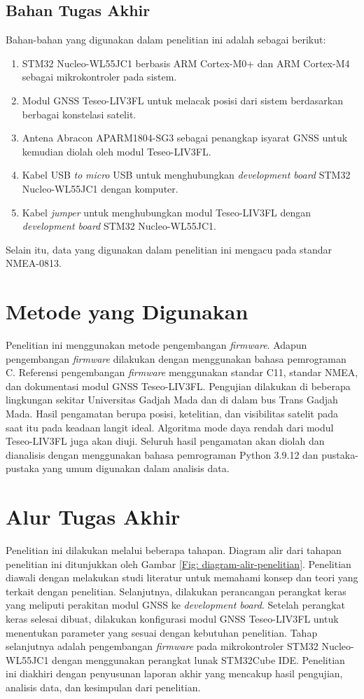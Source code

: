 \subsection{Bahan Tugas Akhir}
Bahan-bahan yang digunakan dalam penelitian ini adalah sebagai berikut:
\begin{enumerate}
	\item STM32 Nucleo-WL55JC1 berbasis ARM Cortex-M0+ dan ARM Cortex-M4 sebagai mikrokontroler pada sistem.
	\item Modul GNSS Teseo\hyp{}LIV3FL untuk melacak posisi dari sistem berdasarkan berbagai konstelasi satelit.
	\item Antena Abracon APARM1804-SG3 sebagai penangkap isyarat GNSS untuk kemudian diolah oleh modul Teseo\hyp{}LIV3FL.
	\item Kabel USB \textit{to} \textit{micro} USB untuk menghubungkan \textit{development board} STM32 Nucleo-WL55JC1 dengan komputer.
	\item Kabel \textit{jumper} untuk menghubungkan modul Teseo\hyp{}LIV3FL dengan \textit{development board} STM32 Nucleo-WL55JC1.
\end{enumerate}
Selain itu, data yang digunakan dalam penelitian ini mengacu pada standar NMEA-0813.

\section{Metode yang Digunakan}
Penelitian ini menggunakan metode pengembangan \textit{firmware}. Adapun pengembangan \textit{firmware} dilakukan dengan menggunakan bahasa pemrograman C. Referensi pengembangan \textit{firmware} menggunakan standar C11, standar NMEA, dan dokumentasi modul GNSS Teseo\hyp{}LIV3FL. Pengujian dilakukan di beberapa lingkungan sekitar Universitas Gadjah Mada dan di dalam bus Trans Gadjah Mada. Hasil pengamatan berupa posisi, ketelitian, dan visibilitas satelit pada saat itu pada keadaan langit ideal. Algoritma mode daya rendah dari modul Teseo\hyp{}LIV3FL juga akan diuji. Seluruh hasil pengamatan akan diolah dan dianalisis dengan menggunakan bahasa pemrograman Python 3.9.12 dan pustaka-pustaka yang umum digunakan dalam analisis data.

\section{Alur Tugas Akhir}
Penelitian ini dilakukan melalui beberapa tahapan. Diagram alir dari tahapan penelitian ini ditunjukkan oleh Gambar \ref{Fig: diagram-alir-penelitian}. Penelitian diawali dengan melakukan studi literatur untuk memahami konsep dan teori yang terkait dengan penelitian. Selanjutnya, dilakukan perancangan perangkat keras yang meliputi perakitan modul GNSS ke \textit{development board}. Setelah perangkat keras selesai dibuat, dilakukan konfigurasi modul GNSS Teseo\hyp{}LIV3FL untuk menentukan parameter yang sesuai dengan kebutuhan penelitian. Tahap selanjutnya adalah pengembangan \textit{firmware} pada mikrokontroler STM32 Nucleo-WL55JC1 dengan menggunakan perangkat lunak STM32Cube IDE. Penelitian ini diakhiri dengan penyusunan laporan akhir yang mencakup hasil pengujian, analisis data, dan kesimpulan dari penelitian.

